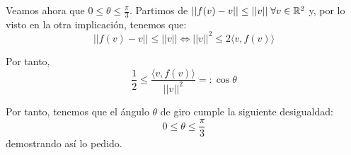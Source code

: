 \begin{ejercicio}
\begin{description}
        Veamos ahora que $0\leq \theta \leq \frac{\pi}{3}$. Partimos de $||f(v)-v|| \leq ||v||\;\forall v\in \mathbb{R}^2$ y, por lo visto en la otra implicación, tenemos que:
        \begin{equation*}
            ||f(v)-v|| \leq ||v|| \Longleftrightarrow
            ||v||^2 \leq 2\langle v,f(v)\rangle
        \end{equation*}

        Por tanto,
        \begin{equation*}
            \frac{1}{2} \leq \frac{\langle v,f(v)\rangle}{||v||^2} =: \cos \theta
        \end{equation*}

        Por tanto, tenemos que el ángulo $\theta$ de giro cumple la siguiente desigualdad:
        \begin{equation*}
            0\leq \theta \leq \frac{\pi}{3}
        \end{equation*}
        demostrando así lo pedido.
    \end{description}
\end{ejercicio}




